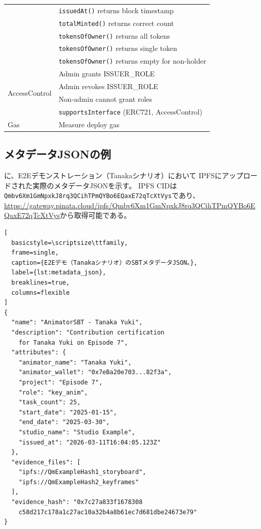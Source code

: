 \begin{table}[ht]
\begin{tabular}{@{}ll@{}}
  & \texttt{issuedAt()} returns block timestamp \\
  & \texttt{totalMinted()} returns correct count \\
  & \texttt{tokensOfOwner()} returns all tokens \\
  & \texttt{tokensOfOwner()} returns single token \\
  & \texttt{tokensOfOwner()} returns empty for non-holder \\
\midrule
\multirow{4}{*}{AccessControl}
  & Admin grants ISSUER\_ROLE \\
  & Admin revokes ISSUER\_ROLE \\
  & Non-admin cannot grant roles \\
  & \texttt{supportsInterface} (ERC721, AccessControl) \\
\midrule
Gas & Measure deploy gas \\
\bottomrule
\end{tabular}
\end{table}

\subsection{メタデータJSONの例}
\label{app:metadata}

に、E2Eデモンストレーション（Tanakaシナリオ）において
IPFSにアップロードされた実際のメタデータJSONを示す。
IPFS CIDは\texttt{Qmbv6Xm1GmNpxkJ8rq3QCihTPmQYBo6EQaxE72qTcXtVys}であり、
\url{https://gateway.pinata.cloud/ipfs/Qmbv6Xm1GmNpxkJ8rq3QCihTPmQYBo6EQaxE72qTcXtVys}から取得可能である。

\begin{lstlisting}[
  basicstyle=\scriptsize\ttfamily,
  frame=single,
  caption={E2Eデモ（Tanakaシナリオ）のSBTメタデータJSON。},
  label={lst:metadata_json},
  breaklines=true,
  columns=flexible
]
{
  "name": "AnimatorSBT - Tanaka Yuki",
  "description": "Contribution certification
    for Tanaka Yuki on Episode 7",
  "attributes": {
    "animator_name": "Tanaka Yuki",
    "animator_wallet": "0x7eBa20e703...82f3a",
    "project": "Episode 7",
    "role": "key_anim",
    "task_count": 25,
    "start_date": "2025-01-15",
    "end_date": "2025-03-30",
    "studio_name": "Studio Example",
    "issued_at": "2026-03-11T16:04:05.123Z"
  },
  "evidence_files": [
    "ipfs://QmExampleHash1_storyboard",
    "ipfs://QmExampleHash2_keyframes"
  ],
  "evidence_hash": "0x7c27a833f1678308
    c58d217c178a1c27ac10a32b4a8b61ec7d681dbe24673e79"
}
\end{lstlisting}

